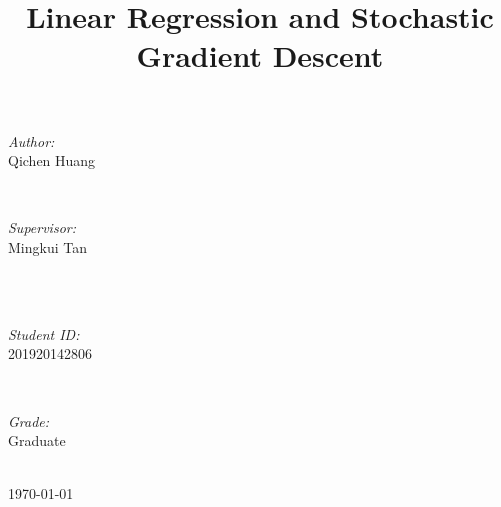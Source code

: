\documentclass[journal, a4paper]{IEEEtran}
\begin{document}
\begin{titlepage}
\begin{minipage}{0.4\textwidth}
\begin{flushleft} \large
\emph{Author:}\\
Qichen Huang %
\end{flushleft}
\end{minipage}
~
\begin{minipage}{0.4\textwidth}
\begin{flushright} \large
\emph{Supervisor:} \\
Mingkui Tan%
\end{flushright}
\end{minipage}\\[2cm]
~
\begin{minipage}{0.4\textwidth}
\begin{flushleft} \large
\emph{Student ID:}\\
201920142806
\end{flushleft}
\end{minipage}
~
\begin{minipage}{0.4\textwidth}
\begin{flushright} \large
\emph{Grade:} \\
Graduate
\end{flushright}
\end{minipage}\\[2cm]



{\large \today}\\[2cm] %



\vfill %

\end{titlepage}

	\title{Linear Regression and Stochastic Gradient Descent}
	\maketitle
\end{document}
